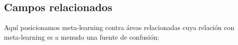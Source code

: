 \subsection{Campos relacionados}\label{subsec:mtl_related_fields}


Aquí posicionamos meta-learning contra áreas relacionadas cuya relación con meta-learning es a menudo una fuente de confusión:

